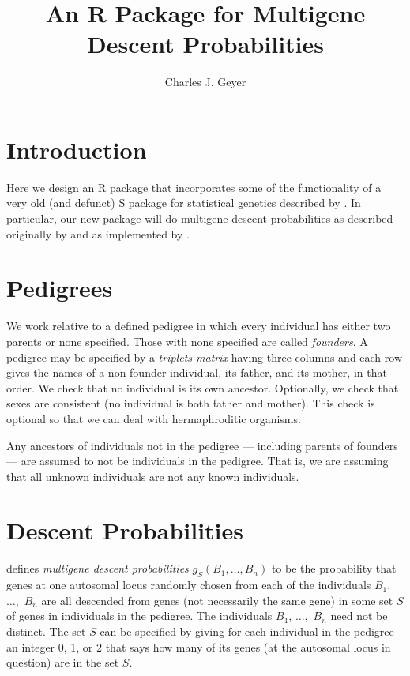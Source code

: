 \documentclass[11pt]{article}
\begin{document}
\title{An R Package for Multigene Descent Probabilities}

\author{Charles J. Geyer}

\maketitle

\section{Introduction}

Here we design an R package that incorporates some of the functionality
of a very old (and defunct) S package for statistical genetics described
by \citet{geyer}.  In particular, our new package will do multigene
descent probabilities as described originally by \citet{thompson} and
as implemented by \citet{geyer}.

\section{Pedigrees}

We work relative to a defined pedigree in which every individual has either
two parents or none specified.  Those with none specified are called
\emph{founders}.  A pedigree may be specified by a \emph{triplets matrix}
having three columns and each row gives the names of a non-founder individual,
its father, and its mother, in that order.  We check that no individual is
its own ancestor.  Optionally, we check that sexes are consistent
(no individual is both father and mother).  This check is optional
so that we can deal with hermaphroditic organisms.

Any ancestors of individuals not in the pedigree --- including parents
of founders --- are assumed to not be individuals in the pedigree.
That is, we are assuming that all unknown individuals are not any known
individuals.

\section{Descent Probabilities}

\citet{thompson} defines \emph{multigene descent probabilities}
$g_S(B_1, \ldots, B_n)$ to be the probability that genes
at one autosomal locus randomly chosen from
each of the individuals $B_1$, $\ldots,$ $B_n$
are all descended from genes (not necessarily the same gene)
in some set $S$ of genes in individuals in the pedigree.
The individuals $B_1$, $\ldots,$ $B_n$ need not be distinct.
The set $S$ can be specified by giving for each individual in the pedigree
an integer 0, 1, or 2 that says how many of its genes (at the autosomal locus
in question) are in the set $S$.
\end{document}
